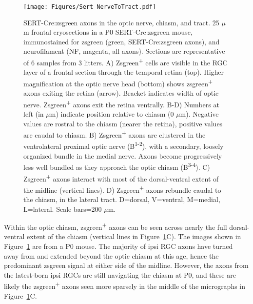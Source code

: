 \begin{figure}[hbtp]
    \begin{center}
        \texttt{[image: Figures/Sert\_NerveToTract.pdf]}
        \caption[SERT-Cre:zsgreen axons in the optic nerve, chiasm, and tract.]
        {SERT-Cre:zsgreen axons in the optic nerve, chiasm, and tract.
        25 $\mu$m frontal cryosections in a P0 SERT-Cre:zsgreen mouse, immunostained for zsgreen (green, SERT-Cre:zsgreen axons), and neurofilament (NF, magenta, all axons).
        Sections are representative of 6 samples from 3 litters. 
        A) Zsgreen\textsuperscript{+} cells are visible in the RGC layer of a frontal section through the temporal retina (top).
        Higher magnification at the optic nerve head (bottom) shows zsgreen\textsuperscript{+} axons exiting the retina (arrow).
        Bracket indicates width of optic nerve.
		Zsgreen\textsuperscript{+} axons exit the retina ventrally.
        B-D) Numbers at left (in $\mu$m) indicate position relative to chiasm (0 $\mu$m).
        Negative values are rostral to the chiasm (nearer the retina), positive values are caudal to chiasm.
        B) Zsgreen\textsuperscript{+} axons are clustered in the ventrolateral proximal optic nerve (B\textsuperscript{1-2}), with a secondary, loosely organized bundle in the medial nerve.
        Axons become progressively less well bundled as they approach the optic chiasm (B\textsuperscript{3-4}).
        C) Zsgreen\textsuperscript{+} axons interact with most of the dorsal-ventral extent of the midline (vertical lines).
        D) Zsgreen\textsuperscript{+} axons rebundle caudal to the chiasm, in the lateral tract.
        D=dorsal, V=ventral, M=medial, L=lateral.
        Scale bars=200 $\mu$m.}
        \label{Figures/SertNerveToTract}
    \end{center}
\end{figure}

Within the optic chiasm, zsgreen\textsuperscript{+} axons can be seen across nearly the full dorsal-ventral extent of the chiasm (vertical lines in Figure~\ref{Figures/SertNerveToTract}C).
The images shown in Figure~\ref{Figures/SertNerveToTract} are from a P0 mouse.
The majority of ipsi RGC axons have turned away from and extended beyond the optic chiasm at this age, hence the predominant zsgreen signal at either side of the midline.
However, the axons from the latest-born ipsi RGCs are still navigating the chiasm at P0, and these are likely the zsgreen\textsuperscript{+} axons seen more sparsely in the middle of the micrographs in Figure~\ref{Figures/SertNerveToTract}C.

